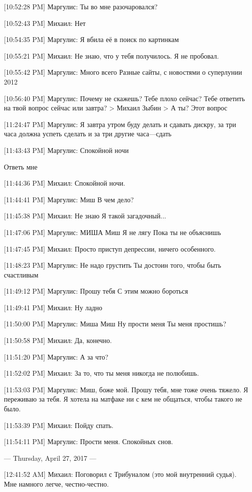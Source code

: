 \documentclass{article}
\begin{document}
[10:52:28 PM] Маргулис:
Ты во мне разочаровался?

[10:52:43 PM] Михаил:
Нет

[10:54:35 PM] Маргулис:
Я вбила её в поиск по картинкам

[10:55:21 PM] Михаил:
Не знаю, что у тебя получилось.
 Я не пробовал.

[10:55:42 PM] Маргулис:
Много всего
 Разные сайты, с новостями о суперлунии 2012

[10:56:40 PM] Маргулис:
Почему не скажешь?
 Тебе плохо сейчас?
 Тебе ответить на твой вопрос сейчас или завтра?
> Михаил Зыбин
> А ты?
Этот вопрос

[11:24:47 PM] Маргулис:
Я завтра утром буду делать и сдавать дискру, за три часа должна успеть сделать и за три другие часа—сдать

[11:43:43 PM] Маргулис:
Спокойной ночи

 Ответь мне

[11:44:36 PM] Михаил:
Спокойной ночи.

[11:44:41 PM] Маргулис:
Миш
 В чем дело?

[11:45:38 PM] Михаил:
Не знаю
 Я такой загадочный...

[11:47:06 PM] Маргулис:
МИША
 Миш
 Я не лягу
 Пока ты не объяснишь

[11:47:45 PM] Михаил:
Просто приступ депрессии, ничего особенного.

[11:48:23 PM] Маргулис:
Не надо грустить
 Ты достоин того, чтобы быть счастливым

[11:49:12 PM] Маргулис:
Прошу тебя
 С этим можно бороться

[11:49:41 PM] Михаил:
Ну ладно

[11:50:00 PM] Маргулис:
Миша
 Миш
 Ну прости меня
 Ты меня простишь?

[11:50:58 PM] Михаил:
Да, конечно.

[11:51:20 PM] Маргулис:
А за что?

[11:52:02 PM] Михаил:
За то, что ты меня никогда не полюбишь.

[11:53:03 PM] Маргулис:
Миш, боже мой. Прошу тебя, мне тоже очень тяжело. Я переживаю за тебя. Я хотела на матфаке ни с кем не общаться, чтобы такого не было.

[11:53:39 PM] Михаил:
Пойду спать.

[11:54:11 PM] Маргулис:
Прости меня.
 Спокойных снов.

--- Thursday, April 27, 2017 ---

[12:41:52 AM] Михаил:
Поговорил с Трибуналом (это мой внутренний судья). Мне намного легче, честно-честно.
\end{document}
